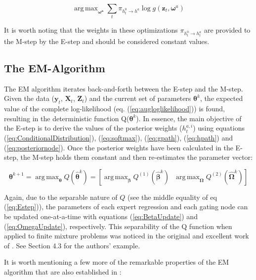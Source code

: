 \documentclass[12pt]{article}
\newcommand{\gateprod}[2]{\pi_{#1 \longrightarrow #2}}
\newcommand{\h}[2]{h^{#1}_{#2}}
\DeclareMathOperator*{\argmax}{arg\,max}
\begin{document}
\begin{equation} \label{eq:OmegaUpdate}
  \argmax_{\boldsymbol{\omega^{a}}} \sum_{t} \gateprod{h^{0}_{t}}{h^{a}} \log g( \boldsymbol{z}_{t}, \boldsymbol{\omega}^{a})
\end{equation}

It is worth noting that the weights in these optimizations 
$\gateprod{h^{0}_{t}}{h^{a}_{t}}$ are provided to the M-step by the
E-step and should be considered constant values.

\subsection{The EM-Algorithm}

The EM algorithm iterates back-and-forth between the E-step and the M-step. 
Given the data ($\boldsymbol{y}_{t}$, 
$\boldsymbol{X}_{t}$, $\boldsymbol{Z}_{t}$) and the current set of parameters
$\boldsymbol{\theta}^{k}$, the expected value of the complete log-likelihood
(eq. (\ref{eq:augloglikelihood})) is found, resulting in the deterministic
function Q($\boldsymbol{\theta}^{k}$). In essence,
the main objective of the E-step is to derive the values of the posterior weights
($\h{a,i}{t}$) using equations (\ref{eq:ConditionalDistribution}), (\ref{eq:softmax}), (\ref{eq:gpath}), (\ref{eq:hpath}) and (\ref{eq:posteriornode}).
Once the posterior weights have been calculated in the E-step,
the M-step holds them constant and then re-estimates the parameter vector:

\begin{equation}
    \boldsymbol{\theta}^{k + 1}  = \argmax_{\boldsymbol{\theta}} Q(\hat{\boldsymbol{\theta}}^{k}) = \left[ \argmax_{\boldsymbol{\beta}} Q^{(1)} ( \hat{\boldsymbol{\beta}}^{k} ) \,\,\,\, \argmax_{\boldsymbol{\Omega}} Q^{(2)} ( \hat{\boldsymbol{\Omega}}^{k} ) \right]
\end{equation}

Again, due to the separable nature of $Q$ (see the middle equality of eq (\ref{eq:Estep})),
the parameters of each expert regression and each gating node can be
updated one-at-a-time with equations (\ref{eq:BetaUpdate}) and
(\ref{eq:OmegaUpdate}), respectively. This separability of the Q function when
applied to finite mixture problems was noticed in the original and excellent
work of \citet{EM_DLR1977}. See Section 4.3 for the authors' example. 

\bigskip

It is worth mentioning a few more of the remarkable properties of the EM algorithm
that are also established in \citet{EM_DLR1977}:
\end{document}
